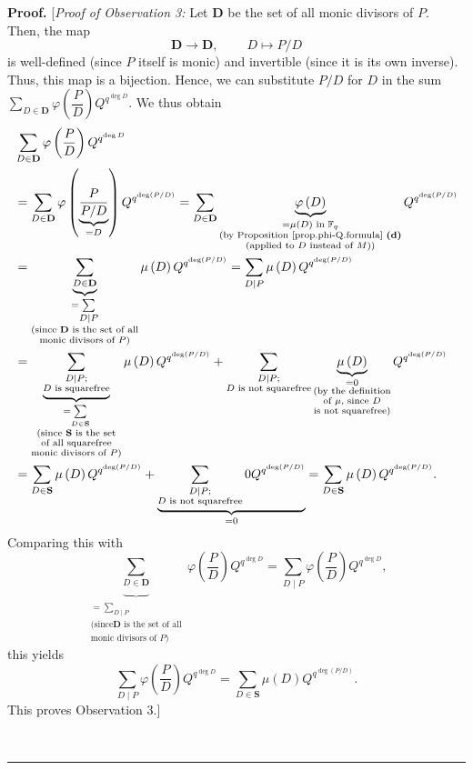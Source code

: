 \documentclass[numbers=enddot,12pt,final,onecolumn,notitlepage]{scrartcl}%
\theoremstyle{definition}
\newenvironment{proof}[1][Proof]{\noindent\textbf{#1.} }{\ \rule{0.5em}{0.5em}}
\let\sumnonlimits\sum
\renewcommand{\sum}{\sumnonlimits\limits}
\begin{document}
\begin{proof}
[\textit{Proof of Observation 3:} Let $\mathbf{D}$ be the set of all monic
divisors of $P$. Then, the map%
\[
\mathbf{D}\rightarrow\mathbf{D},\ \ \ \ \ \ \ \ \ \ D\mapsto P/D
\]
is well-defined (since $P$ itself is monic) and invertible (since it is its
own inverse). Thus, this map is a bijection. Hence, we can substitute $P/D$
for $D$ in the sum $\sum_{D\in\mathbf{D}}\varphi\left(  \dfrac{P}{D}\right)
Q^{q^{\deg D}}$. We thus obtain
\begin{align*}
&  \sum_{D\in\mathbf{D}}\varphi\left(  \dfrac{P}{D}\right)  Q^{q^{\deg D}}\\
&  =\sum_{D\in\mathbf{D}}\varphi\left(  \underbrace{\dfrac{P}{P/D}}%
_{=D}\right)  Q^{q^{\deg\left(  P/D\right)  }}=\sum_{D\in\mathbf{D}%
}\underbrace{\varphi\left(  D\right)  }_{\substack{=\mu\left(  D\right)
\text{ in }\mathbb{F}_{q}\\\text{(by Proposition \ref{prop.phi-Q.formula}
\textbf{(d)}}\\\text{(applied to }D\text{ instead of }M\text{))}}%
}Q^{q^{\deg\left(  P/D\right)  }}\\
&  =\underbrace{\sum_{D\in\mathbf{D}}}_{\substack{=\sum_{\substack{D\mid
P}}\\\text{(since }\mathbf{D}\text{ is the set of all}\\\text{monic divisors
of }P\text{)}}}\mu\left(  D\right)  Q^{q^{\deg\left(  P/D\right)  }}%
=\sum_{\substack{D\mid P}}\mu\left(  D\right)  Q^{q^{\deg\left(  P/D\right)
}}\\
&  =\underbrace{\sum_{\substack{D\mid P;\\D\text{ is squarefree}}%
}}_{\substack{=\sum_{D\in\mathbf{S}}\\\text{(since }\mathbf{S}\text{ is the
set}\\\text{of all squarefree}\\\text{monic divisors of }P\text{)}}}\mu\left(
D\right)  Q^{q^{\deg\left(  P/D\right)  }}+\sum_{\substack{D\mid P;\\D\text{
is not squarefree}}}\underbrace{\mu\left(  D\right)  }%
_{\substack{=0\\\text{(by the definition}\\\text{of }\mu\text{, since
}D\\\text{is not squarefree)}}}Q^{q^{\deg\left(  P/D\right)  }}\\
&  =\sum_{D\in\mathbf{S}}\mu\left(  D\right)  Q^{q^{\deg\left(  P/D\right)  }%
}+\underbrace{\sum_{\substack{D\mid P;\\D\text{ is not squarefree}%
}}0Q^{q^{\deg\left(  P/D\right)  }}}_{=0}=\sum_{D\in\mathbf{S}}\mu\left(
D\right)  Q^{q^{\deg\left(  P/D\right)  }}.
\end{align*}
Comparing this with%
\[
\underbrace{\sum_{D\in\mathbf{D}}}_{\substack{=\sum_{D\mid P}\\\text{(since
}\mathbf{D}\text{ is the set of all}\\\text{monic divisors of }P\text{)}%
}}\varphi\left(  \dfrac{P}{D}\right)  Q^{q^{\deg D}}=\sum_{D\mid P}%
\varphi\left(  \dfrac{P}{D}\right)  Q^{q^{\deg D}},
\]
this yields%
\[
\sum_{D\mid P}\varphi\left(  \dfrac{P}{D}\right)  Q^{q^{\deg D}}=\sum
_{D\in\mathbf{S}}\mu\left(  D\right)  Q^{q^{\deg\left(  P/D\right)  }}.
\]
This proves Observation 3.]


\end{proof}
\end{document}
